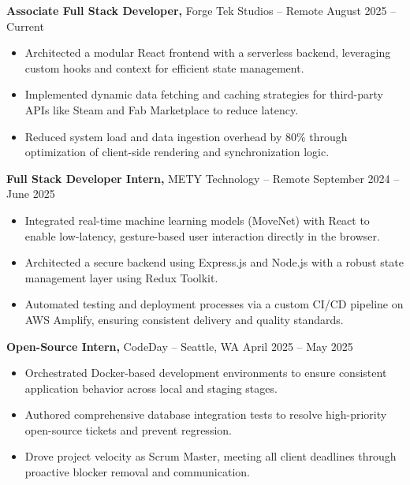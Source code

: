 \documentclass[11pt]{article}       %
\begin{document}
\textbf{Associate Full Stack Developer,} {Forge Tek Studios} -- Remote \hfill August 2025 -- Current \\
\vspace{-9pt}
\begin{itemize}
  \item Architected a modular React frontend with a serverless backend, leveraging custom hooks and context for efficient state management.
  \item Implemented dynamic data fetching and caching strategies for third-party APIs like Steam and Fab Marketplace to reduce latency.
  \item Reduced system load and data ingestion overhead by 80\% through optimization of client-side rendering and synchronization logic.
\end{itemize}

\textbf{Full Stack Developer Intern,} {METY Technology} -- Remote \hfill September 2024 -- June 2025 \\
\vspace{-9pt}
\begin{itemize}
  \item Integrated real-time machine learning models (MoveNet) with React to enable low-latency, gesture-based user interaction directly in the browser.
  \item Architected a secure backend using Express.js and Node.js with a robust state management layer using Redux Toolkit.
  \item Automated testing and deployment processes via a custom CI/CD pipeline on AWS Amplify, ensuring consistent delivery and quality standards.
\end{itemize}

\textbf{Open-Source Intern,} {CodeDay} -- Seattle, WA \hfill April 2025 -- May 2025 \\
\vspace{-9pt}
\begin{itemize}
  \item Orchestrated Docker-based development environments to ensure consistent application behavior across local and staging stages.
  \item Authored comprehensive database integration tests to resolve high-priority open-source tickets and prevent regression.
  \item Drove project velocity as Scrum Master, meeting all client deadlines through proactive blocker removal and communication.
\end{itemize}
\end{document}
